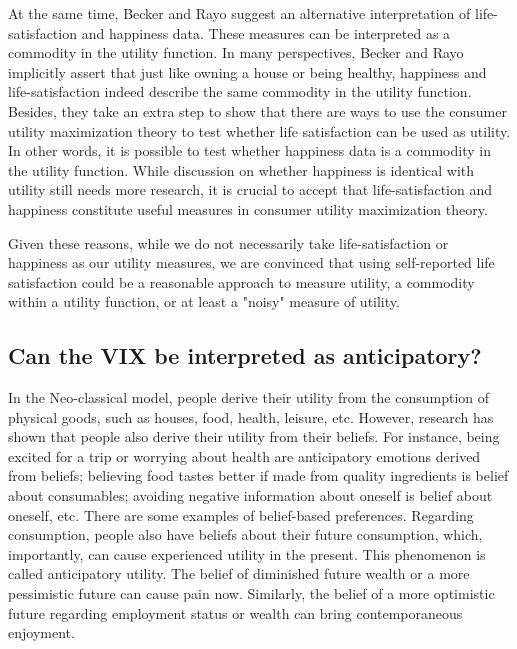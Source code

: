 \documentclass[11pt,a4paper,oldfontcommands]{memoir}
\begin{document}
{At the same time, Becker and Rayo suggest an alternative interpretation of life-satisfaction and happiness data. These measures can be interpreted as a commodity in the utility function. In many perspectives, Becker and Rayo implicitly assert that just like owning a house or being healthy, happiness and life-satisfaction indeed describe the same commodity in the utility function. Besides, they take an extra step to show that there are ways to use the consumer utility maximization theory to test whether life satisfaction can be used as utility. In other words, it is possible to test whether happiness data is a commodity in the utility function. While discussion on whether happiness is identical with utility still needs more research, it is crucial to accept that life-satisfaction and happiness constitute useful measures in consumer utility maximization theory.

Given these reasons, while we do not necessarily take life-satisfaction or happiness as our utility measures, we are convinced that using self-reported life satisfaction could be a reasonable approach to measure utility, a commodity within a utility function, or at least a "noisy" measure of utility.

 
\subsection{Can the VIX be interpreted as anticipatory?}

In the Neo-classical model, people derive their utility from the consumption of physical goods, such as houses, food, health, leisure, etc. However, research has shown that people also derive their utility from their beliefs. For instance, being excited for a trip or worrying about health are anticipatory emotions derived from beliefs; believing food tastes better if made from quality ingredients is belief about consumables; avoiding negative information about oneself is belief about oneself, etc. There are some examples of belief-based preferences. Regarding consumption, people also have beliefs about their future consumption, which, importantly, can cause experienced utility in the present. This phenomenon is called anticipatory utility. The belief of diminished future wealth or a more pessimistic future can cause pain now. Similarly, the belief of a more optimistic future regarding employment status or wealth can bring contemporaneous enjoyment.

}
\end{document}
